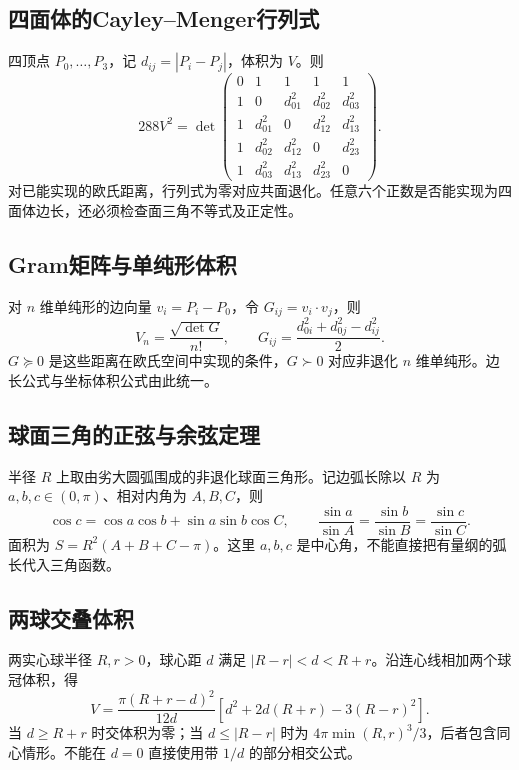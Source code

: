 \documentclass[../main.tex]{subfiles}
\begin{document}
\subsection{四面体的Cayley--Menger行列式}
四顶点 $P_0,\ldots,P_3$，记 $d_{ij}=|P_i-P_j|$，体积为 $V$。则
\[
288V^2=\det\begin{pmatrix}
0&1&1&1&1\\
1&0&d_{01}^2&d_{02}^2&d_{03}^2\\
1&d_{01}^2&0&d_{12}^2&d_{13}^2\\
1&d_{02}^2&d_{12}^2&0&d_{23}^2\\
1&d_{03}^2&d_{13}^2&d_{23}^2&0
\end{pmatrix}.
\]
对已能实现的欧氏距离，行列式为零对应共面退化。任意六个正数是否能实现为四面体边长，还必须检查面三角不等式及正定性。
\subsection{Gram矩阵与单纯形体积}
对 $n$ 维单纯形的边向量 $v_i=P_i-P_0$，令 $G_{ij}=v_i\cdot v_j$，则
\[
V_n=\frac{\sqrt{\det G}}{n!},\qquad
G_{ij}=\frac{d_{0i}^2+d_{0j}^2-d_{ij}^2}{2}.
\]
$G\succeq0$ 是这些距离在欧氏空间中实现的条件，$G\succ0$ 对应非退化 $n$ 维单纯形。边长公式与坐标体积公式由此统一。
\subsection{球面三角的正弦与余弦定理}
半径 $R$ 上取由劣大圆弧围成的非退化球面三角形。记边弧长除以 $R$ 为 $a,b,c\in(0,\pi)$、相对内角为 $A,B,C$，则
\[
\cos c=\cos a\cos b+\sin a\sin b\cos C,\qquad
\frac{\sin a}{\sin A}=\frac{\sin b}{\sin B}=\frac{\sin c}{\sin C}.
\]
面积为 $S=R^2(A+B+C-\pi)$。这里 $a,b,c$ 是中心角，不能直接把有量纲的弧长代入三角函数。
\subsection{两球交叠体积}
两实心球半径 $R,r>0$，球心距 $d$ 满足 $|R-r|<d<R+r$。沿连心线相加两个球冠体积，得
\[
V=\frac{\pi(R+r-d)^2}{12d}
\left[d^2+2d(R+r)-3(R-r)^2\right].
\]
当 $d\ge R+r$ 时交体积为零；当 $d\le|R-r|$ 时为 $4\pi\min(R,r)^3/3$，后者包含同心情形。不能在 $d=0$ 直接使用带 $1/d$ 的部分相交公式。
\clearpage
\end{document}
